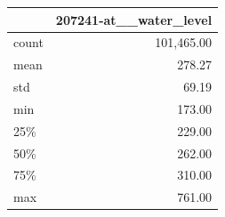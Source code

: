 \begin{tabular}{lr}
\toprule
 & 207241-at\_\_water\_level \\
\midrule
count & 101,465.00 \\
mean & 278.27 \\
std & 69.19 \\
min & 173.00 \\
25\% & 229.00 \\
50\% & 262.00 \\
75\% & 310.00 \\
max & 761.00 \\
\bottomrule
\end{tabular}
